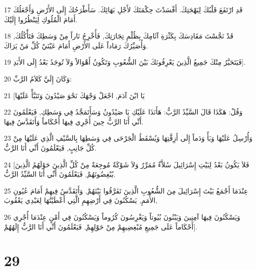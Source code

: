 \par 17 قَدِ ارْتَفَعَ قَلْبُكَ لِبَهْجَتِكَ. أَفْسَدْتَ حِكْمَتَكَ لأَجْلِ بَهَائِكَ. سَأَطْرَحُكَ إِلَى الأَرْضِ وَأَجْعَلُكَ أَمَامَ الْمُلُوكِ لِيَنْظُرُوا إِلَيْكَ.
\par 18 قَدْ نَجَّسْتَ مَقَادِسَكَ بِكَثْرَةِ آثَامِكَ بِظُلْمِ تِجَارَتِكَ, فَأُخْرِجُ نَاراً مِنْ وَسَطِكَ فَتَأْكُلُكَ, وَأُصَيِّرُكَ رَمَاداً عَلَى الأَرْضِ أَمَامَ عَيْنَيْ كُلِّ مَنْ يَرَاكَ.
\par 19 فَيَتَحَيَّرُ مِنْكَ جَمِيعُ الَّذِينَ يَعْرِفُونَكَ بَيْنَ الشُّعُوبِ وَتَكُونُ أَهْوَالاً وَلاَ تُوجَدُ بَعْدُ إِلَى الأَبَدِ].
\par 20 وَكَانَ إِلَيَّ كَلاَمُ الرَّبِّ:
\par 21 [يَا ابْنَ آدَمَ, اجْعَلْ وَجْهَكَ نَحْوَ صَيْدُونَ وَتَنَبَّأْ عَلَيْهَا
\par 22 وَقُلْ: هَكَذَا قَالَ السَّيِّدُ الرَّبُّ: هَأَنَذَا عَلَيْكِ يَا صَيْدُونُ وَسَأَتَمَجَّدُ فِي وَسَطِكِ, فَيَعْلَمُونَ أَنِّي أَنَا الرَّبُّ حِينَ أُجْرِي فِيهَا أَحْكَاماً وَأَتَقَدَّسُ فِيهَا.
\par 23 وَأُرْسِلُ عَلَيْهَا وَبَأً وَدَماً إِلَى أَزِقَّتِهَا وَيُسْقَطُ الْجَرْحَى فِي وَسَطِهَا بِالسَّيْفِ الَّذِي عَلَيْهَا مِنْ كُلِّ جَانِبٍ, فَيَعْلَمُونَ أَنِّي أَنَا الرَّبُّ.
\par 24 [فَلاَ يَكُونُ بَعْدُ لِبَيْتِ إِسْرَائِيلَ سُلاَّءٌ مُمَرِّرٌ وَلاَ شَوْكَةٌ مُوجِعَةٌ مِنْ كُلِّ الَّذِينَ حَوْلَهُمُ الَّذِينَ يُبْغِضُونَهُمْ, فَيَعْلَمُونَ أَنِّي أَنَا السَّيِّدُ الرَّبُّ.
\par 25 عِنْدَمَا أَجْمَعُ بَيْتَ إِسْرَائِيلَ مِنَ الشُّعُوبِ الَّذِينَ تَفَرَّقُوا بَيْنَهُمْ, وَأَتَقَدَّسُ فِيهِمْ أَمَامَ عُيُونِ الأُمَمِ, يَسْكُنُونَ فِي أَرْضِهِمِ الَّتِي أَعْطَيْتُهَا لِعَبْدِي يَعْقُوبَ,
\par 26 وَيَسْكُنُونَ فِيهَا آمِنِينَ وَيَبْنُونَ بُيُوتاً وَيَغْرِسُونَ كُرُوماً وَيَسْكُنُونَ فِي أَمْنٍ عِنْدَمَا أُجْرِي أَحْكَاماً عَلَى جَمِيعِ مُبْغِضِيهِمْ مِنْ حَوْلِهِمْ, فَيَعْلَمُونَ أَنِّي أَنَا الرَّبُّ إِلَهُهُمْ].

\chapter{29}

